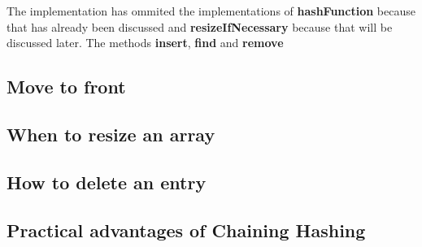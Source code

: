 The implementation has ommited the implementations of \textbf{hashFunction} because that has already been discussed and \textbf{resizeIfNecessary} because that will be discussed later. The methods \textbf{insert}, \textbf{find} and \textbf{remove}


\subsection{Move to front}

\subsection{When to resize an array}

\subsection{How to delete an entry}

\subsection{Practical advantages of Chaining Hashing}

